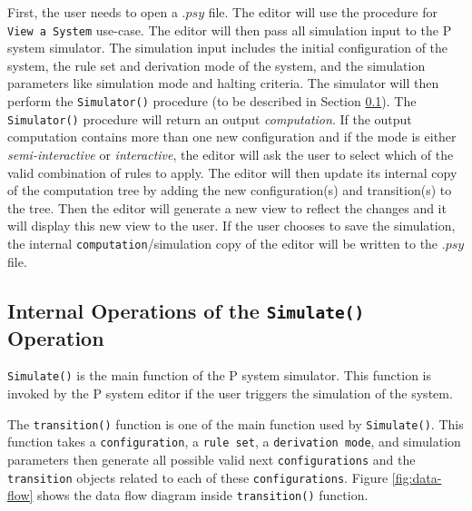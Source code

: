 \documentclass{article}
\begin{document}
First, the user needs to open a $.psy$ file. The editor will use the procedure for \texttt{View a
System} use-case. The editor will then pass all simulation input to the P system simulator. The
simulation input includes the initial configuration of the system, the rule set and derivation mode
of the system, and the simulation parameters like simulation mode and halting criteria. The 
simulator will then perform the \texttt{Simulator()} procedure (to be described in Section 
\ref{s-simulate}). The \texttt{Simulator()} procedure will return an output \textit{computation}.
If the output computation contains more than one new configuration and if the mode is either
\textit{semi-interactive} or \textit{interactive}, the editor will ask the user to select which of
the valid combination of rules to apply. The editor will then update its internal copy of the
computation tree by adding the new configuration(s) and transition(s) to the tree. Then the editor
will generate a new view to reflect the changes and it will display this new view to the user.
If the user chooses to save the simulation, the internal \texttt{computation}/simulation copy of the
editor will be written to the $.psy$ file.


\subsection{Internal Operations of the \texttt{Simulate()} Operation}\label{s-simulate}

\texttt{Simulate()} is the main function of the P system simulator. This function is invoked by the
P system editor if the user triggers the simulation of the system.

The \texttt{transition()} function is one of the main function used by \texttt{Simulate()}. This
function takes a \texttt{configuration}, a \texttt{rule set}, a \texttt{derivation mode}, and
simulation parameters then generate all possible valid next \texttt{configurations} and the 
\texttt{transition} objects related to each of these \texttt{configurations}. Figure 
\ref{fig:data-flow} shows the data flow diagram inside \texttt{transition()} function.
\end{document}
